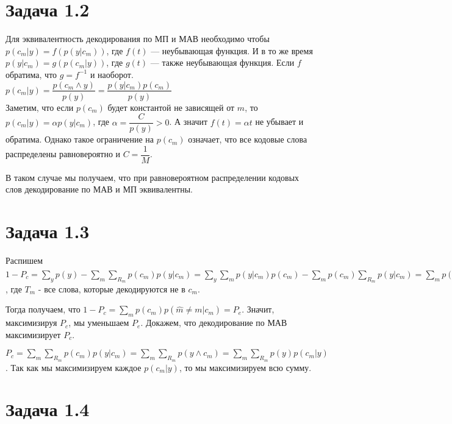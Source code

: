\documentclass[fontsize=12pt]{article}
\begin{document}
\section*{Задача 1.2}

Для эквивалентность декодирования по МП и МАВ необходимо чтобы $p(c_m|y) = f(p(y|c_m))$, где $f(t)$ --- неубывающая функция. И в то же время $p(y|c_m) = g(p(c_m|y))$, где $g(t)$ --- также неубывающая функция. Если $f$ обратима, что $g = f^{-1}$ и наоборот.\\

$p(c_m|y) = \dfrac{p(c_m \wedge y)}{p(y)} = \dfrac{p(y|c_m) p(c_m)}{p(y)}$\\ 

Заметим, что если $p(c_m)$ будет константой не зависящей от $m$, то 
$p(c_m|y) = \alpha p(y|c_m)$, где $\alpha = \dfrac{C}{p(y)} > 0$. А значит $f(t) = \alpha t$ не убывает и обратима. Однако такое ограничение на $p(c_m)$ означает, что все кодовые слова распределены равновероятно и $C = \dfrac{1}{M}$.

В таком случае мы получаем, что при равновероятном распределении кодовых слов декодирование по МАВ и МП эквивалентны.

\section*{Задача 1.3}

Распишем $1 - P_c = 
\sum\limits_{y} p(y) - 
\sum\limits_{m} \sum\limits_{R_m}p(c_m)p(y|c_m) = 
\sum\limits_{y} \sum\limits_{m}p(y|c_m)p(c_m) - 
\sum\limits_{m} p(c_m) \sum\limits_{R_m}p(y|c_m) =
\sum\limits_{m} p(c_m) \sum\limits_{y}p(y|c_m) -
\sum\limits_{m} p(c_m) \sum\limits_{R_m}p(y|c_m) =
\sum\limits_{m} p(c_m) \left(\sum\limits_{y}p(y|c_m) - \sum\limits_{R_m}p(y|c_m)\right) =
\sum\limits_{m} p(c_m) \sum\limits_{T_m}p(y|c_m)
$, где $T_m$ - все слова, которые декодируются не в $c_m$. 

Тогда получаем, что $1 - P_c = \sum\limits_{m} p(c_m) p(\widehat{m} \neq m|c_m) = P_e$. Значит, максимизируя $P_c$, мы уменьшаем $P_e$. Докажем, что декодирование по МАВ максимизирует $P_c$.

$P_c = \sum\limits_{m}\sum\limits_{R_m}p(c_m)p(y|c_m) = \sum\limits_{m}\sum\limits_{R_m}p(y \wedge c_m) = \sum\limits_{m}\sum\limits_{R_m}p(y)p(c_m|y)$. Так как мы максимизируем каждое $p(c_m|y)$, то мы максимизируем всю сумму.

\section*{Задача 1.4} 
\end{document}
